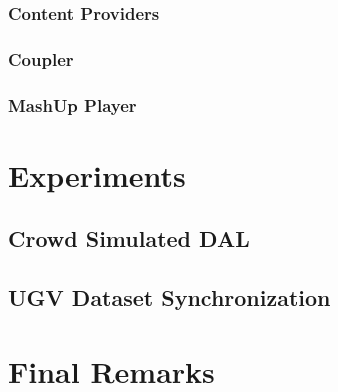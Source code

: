 \documentclass[jidm,a4paper]{jidm} %
\begin{document}
\subsubsection{Content Providers}


\subsubsection{Coupler}


\subsubsection{MashUp Player}


\section{Experiments}


\subsection{Crowd Simulated DAL}


\subsection{UGV Dataset Synchronization} 


\section{Final Remarks}




\end{document}
